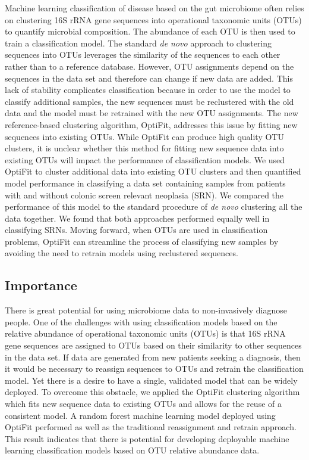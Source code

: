 \documentclass[
]{article}
\begin{document}
Machine learning classification of disease based on the gut microbiome
often relies on clustering 16S rRNA gene sequences into operational
taxonomic units (OTUs) to quantify microbial composition. The abundance
of each OTU is then used to train a classification model. The standard
\emph{de novo} approach to clustering sequences into OTUs leverages the
similarity of the sequences to each other rather than to a reference
database. However, OTU assignments depend on the sequences in the data
set and therefore can change if new data are added. This lack of
stability complicates classification because in order to use the model
to classify additional samples, the new sequences must be reclustered
with the old data and the model must be retrained with the new OTU
assignments. The new reference-based clustering algorithm, OptiFit,
addresses this issue by fitting new sequences into existing OTUs. While
OptiFit can produce high quality OTU clusters, it is unclear whether
this method for fitting new sequence data into existing OTUs will impact
the performance of classification models. We used OptiFit to cluster
additional data into existing OTU clusters and then quantified model
performance in classifying a data set containing samples from patients
with and without colonic screen relevant neoplasia (SRN). We compared
the performance of this model to the standard procedure of \emph{de
novo} clustering all the data together. We found that both approaches
performed equally well in classifying SRNs. Moving forward, when OTUs
are used in classification problems, OptiFit can streamline the process
of classifying new samples by avoiding the need to retrain models using
reclustered sequences.

\hypertarget{importance}{%
\subsection{Importance}\label{importance}}

There is great potential for using microbiome data to non-invasively
diagnose people. One of the challenges with using classification models
based on the relative abundance of operational taxonomic units (OTUs) is
that 16S rRNA gene sequences are assigned to OTUs based on their
similarity to other sequences in the data set. If data are generated
from new patients seeking a diagnosis, then it would be necessary to
reassign sequences to OTUs and retrain the classification model. Yet
there is a desire to have a single, validated model that can be widely
deployed. To overcome this obstacle, we applied the OptiFit clustering
algorithm which fits new sequence data to existing OTUs and allows for
the reuse of a consistent model. A random forest machine learning model
deployed using OptiFit performed as well as the traditional reassignment
and retrain approach. This result indicates that there is potential for
developing deployable machine learning classification models based on
OTU relative abundance data.
\end{document}
